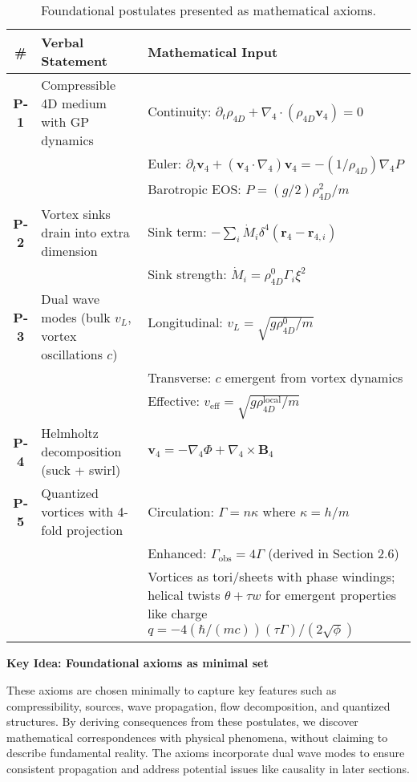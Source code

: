 \begin{table}[H]
\centering
\begin{tabularx}{\textwidth}{|c|Y|Y|}
\hline
\# & Verbal Statement & Mathematical Input \\
\hline
\textbf{P-1} & Compressible 4D medium with GP dynamics & Continuity: $\partial_t \rho_{4D} + \nabla_4 \cdot (\rho_{4D} \mathbf{v}_4) = 0$ \\
& & Euler: $\partial_t \mathbf{v}_4 + (\mathbf{v}_4 \cdot \nabla_4) \mathbf{v}_4 = -(1/\rho_{4D}) \nabla_4 P$ \\
& & Barotropic EOS: $P = (g/2) \rho_{4D}^2 / m$ \\
\hline
\textbf{P-2} & Vortex sinks drain into extra dimension & Sink term: $-\sum_i \dot{M}_i \delta^4(\mathbf{r}_4 - \mathbf{r}_{4,i})$ \\
& & Sink strength: $\dot{M}_i = \rho_{4D}^0 \Gamma_i \xi^2$ \\
\hline
\textbf{P-3} & Dual wave modes (bulk $v_L$, vortex oscillations $c$) & Longitudinal: $v_L = \sqrt{g \rho_{4D}^0 / m}$ \\
& & Transverse: $c$ emergent from vortex dynamics \\
& & Effective: $v_{\text{eff}} = \sqrt{g \rho_{4D}^{\text{local}} / m}$ \\
\hline
\textbf{P-4} & Helmholtz decomposition (suck + swirl) & $\mathbf{v}_4 = -\nabla_4 \Phi + \nabla_4 \times \mathbf{B}_4$ \\
\hline
\textbf{P-5} & Quantized vortices with 4-fold projection & Circulation: $\Gamma = n \kappa$ where $\kappa = h / m$ \\
& & Enhanced: $\Gamma_{\text{obs}} = 4 \Gamma$ (derived in Section 2.6) \\
& & Vortices as tori/sheets with phase windings; helical twists $\theta + \tau w$ for emergent properties like charge $q = -4 (\hbar / (m c)) (\tau \Gamma) / (2 \sqrt{\phi})$ \\
\hline
\end{tabularx}
\caption{Foundational postulates presented as mathematical axioms.}
\label{tab:postulates}
\end{table}

\textbf{Key Idea: Foundational axioms as minimal set}

These axioms are chosen minimally to capture key features such as compressibility, sources, wave propagation, flow decomposition, and quantized structures. By deriving consequences from these postulates, we discover mathematical correspondences with physical phenomena, without claiming to describe fundamental reality. The axioms incorporate dual wave modes to ensure consistent propagation and address potential issues like causality in later sections.

